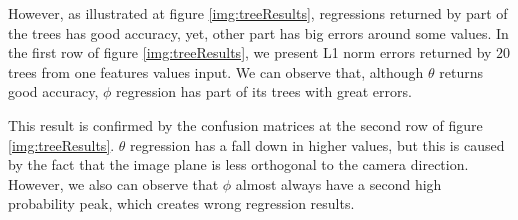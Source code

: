\documentclass[annual]{acmsiggraph}
\begin{document}
However, as illustrated at figure \ref{img:treeResults}, regressions returned by part of the trees has good accuracy, yet, other part has big errors around some values. In the first row of figure \ref{img:treeResults}, we present L1 norm errors returned by $20$ trees from one features values input. We can observe that, although $\theta$ returns good accuracy, $\phi$ regression has part of its trees with great errors. 

This result is confirmed by the confusion matrices at the second row of figure \ref{img:treeResults}. $\theta$ regression has a fall down in higher values, but this is caused by the fact that the image plane is less orthogonal to the camera direction. However, we also can observe that $\phi$ almost always have a second high probability peak, which creates wrong regression results.
	
\end{document}
